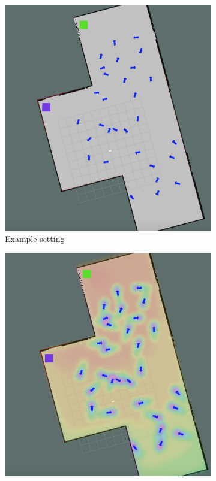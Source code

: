 \documentclass[letterpaper, 10 pt, conference]{ieeeconf}
\begin{document}
	\begin{figure}[tbh]
	\centering
      \begin{subfigure}[b]{0.35\columnwidth}
    \includegraphics[scale = 0.15]{images/no_cf.png}
    \caption{Example setting }
    \label{fig:exp_setting}
  \end{subfigure}
  \hspace{10mm}
  \begin{subfigure}[b]{0.35\columnwidth}
  \hspace{4mm}
    \includegraphics[scale = 0.15]{images/cf.png}

\end{subfigure}
\end{figure}
\end{document}
